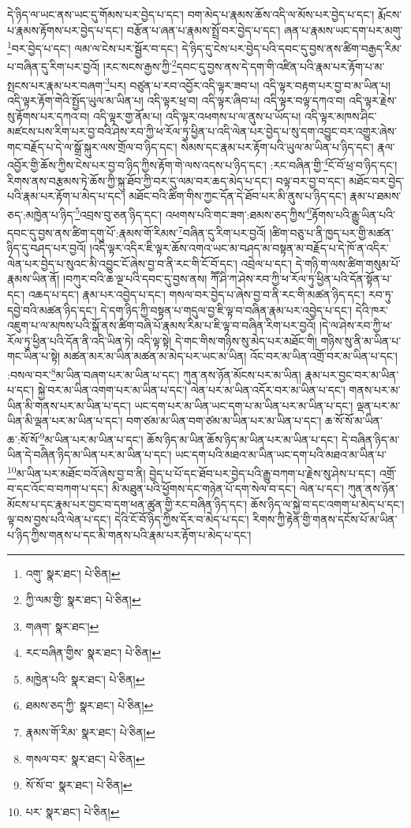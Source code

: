 དེ་ཉིད་ལ་ཡང་ནས་ཡང་དུ་གོམས་པར་བྱེད་པ་དང་། བག་མེད་པ་རྣམས་ཆོས་འདི་ལ་མོས་པར་བྱེད་པ་དང་། རྨོངས་པ་རྣམས་རྟོགས་པར་བྱེད་པ་དང་། བརྩོན་པ་ཞན་པ་རྣམས་སྤྲོ་བར་བྱེད་པ་དང་། ཞན་པ་རྣམས་ཡང་དག་པར་མགུ་\footnote{འགུ་  སྣར་ཐང་།  པེ་ཅིན། }བར་བྱེད་པ་དང་། ལམ་ལ་ངེས་པར་སྦྱོར་བ་དང་། དེ་ཉིད་དུ་ངེས་པར་བྱེད་པའི་དབང་དུ་བྱས་ནས་ཚིག་བརྒྱད་རིམ་པ་བཞིན་དུ་རིག་པར་བྱའོ། །རང་སངས་རྒྱས་ཀྱི་\footnote{ཀྱི་ལམ་གྱི་  སྣར་ཐང་།  པེ་ཅིན། }དབང་དུ་བྱས་ནས་དེ་དག་གི་འཛིན་པའི་རྣམ་པར་རྟོག་པ་མ་སྤངས་པར་རྣམ་པར་བཞག་\footnote{གཞག་  སྣར་ཐང་། }པར། བཙུན་པ་རབ་འབྱོར་འདི་ལྟར་ཟབ་པ། འདི་ལྟར་བརྟག་པར་བྱ་བ་མ་ཡིན་པ། འདི་ལྟར་རྟོག་གེའི་སྤྱོད་ཡུལ་མ་ཡིན་པ། འདི་ལྟར་ཕྲ་བ། འདི་ལྟར་ཞིབ་པ། འདི་ལྟར་བལྟ་དཀའ་བ། འདི་ལྟར་རྗེས་སུ་རྟོགས་པར་དཀའ་བ། འདི་ལྟར་གྱ་ནོམ་པ། འདི་ལྟར་འཕགས་པ་ལ་ནུས་པ་ཡོད་པ། འདི་ལྟར་མཁས་ཤིང་མཛངས་པས་རིག་པར་བྱ་བའི་ཤེས་རབ་ཀྱི་ཕ་རོལ་ཏུ་ཕྱིན་པ་འདི་ལེན་པར་བྱེད་པ་སུ་དག་འབྱུང་བར་འགྱུར་ཞེས་གང་བརྗོད་པ་དེ་ལ་སྒྲོ་སྐུར་ལས་གྲོལ་བ་ཉིད་དང་། སེམས་དང་རྣམ་པར་རྟོག་པའི་ཡུལ་མ་ཡིན་པ་ཉིད་དང་། རྣལ་འབྱོར་གྱི་ཆོས་ཀྱིས་ངེས་པར་བྱ་བ་ཉིད་ཀྱིས་རྟོག་གེ་ལས་འདས་པ་ཉིད་དང་། :རང་བཞིན་གྱི་\footnote{རང་བཞིན་གྱིས་  སྣར་ཐང་།  པེ་ཅིན། }ངོ་བོ་ཕྲ་བ་ཉིད་དང་། རིགས་ནས་བརྩམས་ཏེ་ཆོས་ཀྱི་སྐུ་ཐོབ་ཀྱི་བར་དུ་ལམ་བར་ཆད་མེད་པ་དང་། བལྟ་བར་བྱ་བ་དང་། མཐོང་བར་བྱེད་པའི་རྣམ་པར་རྟོག་པ་མེད་པ་དང་། མཐོང་བའི་ཚིག་གིས་ཀྱང་དོན་དེ་ཐོབ་པར་མི་ནུས་པ་ཉིད་དང་། རྣམ་པ་ཐམས་ཅད་:མཁྱེན་པ་ཉིད་\footnote{མཁྱེན་པའི་  སྣར་ཐང་།  པེ་ཅིན། }འབྲས་བུ་ཅན་ཉིད་དང་། འཕགས་པའི་གང་ཟག་:ཐམས་ཅད་ཀྱིས་\footnote{ཐམས་ཅད་ཀྱི་  སྣར་ཐང་།  པེ་ཅིན། }རྟོགས་པའི་རྒྱུ་ཡིན་པའི་དབང་དུ་བྱས་ནས་ཚིག་དགུ་པོ་:རྣམས་གོ་རིམས་\footnote{རྣམས་གོ་རིམ་  སྣར་ཐང་།  པེ་ཅིན། }བཞིན་དུ་རིག་པར་བྱའོ། །ཚིག་བཅུ་པ་ནི་ཁྱད་པར་གྱི་མཚན་ཉིད་དུ་བཤད་པར་བྱའོ། །འདི་ལྟར་འདིར་ཇི་ལྟར་ཆོས་འགའ་ཡང་མ་བཤད་མ་བསྟན་མ་བརྗོད་པ་དེ་ཁོ་ན་འདིར་ལེན་པར་བྱེད་པ་སུའང་མི་འབྱུང་ངོ་ཞེས་བྱ་བ་ནི་རང་གི་ངོ་བོ་དང་། འབྲེལ་པ་དང་། དེ་གཉི་ག་ལས་ཚིག་གསུམ་པོ་རྣམས་ཡིན་ནོ། །བཀུར་བའི་ཆ་ལྔ་པའི་དབང་དུ་བྱས་ནས། ཀཽ་ཤི་ཀ་ཤེས་རབ་ཀྱི་ཕ་རོལ་ཏུ་ཕྱིན་པའི་དོན་སྟོན་པ་དང་། འཆད་པ་དང་། རྣམ་པར་འབྱེད་པ་དང་། གསལ་བར་བྱེད་པ་ཞེས་བྱ་བ་ནི་རང་གི་མཚན་ཉིད་དང་། རབ་ཏུ་དབྱེ་བའི་མཚན་ཉིད་དང་། དེ་དག་ཉིད་ཀྱི་བསྟན་པ་གདུལ་བྱ་ཇི་ལྟ་བ་བཞིན་རྣམ་པར་འབྱེད་པ་དང་། དེའི་ཁར་འཇུག་པ་ལ་མཁས་པའི་སྒོ་ནས་ཚིག་བཞི་པོ་རྣམས་རིམ་པ་ཇི་ལྟ་བ་བཞིན་རིག་པར་བྱའོ། །དེ་ལ་ཤེས་རབ་ཀྱི་ཕ་རོལ་ཏུ་ཕྱིན་པའི་དོན་ནི་འདི་ཡིན་ཏེ། འདི་ལྟ་སྟེ། དེ་གང་གིས་གཉིས་སུ་མེད་པར་མཐོང་གི། གཉིས་སུ་ནི་མ་ཡིན་པ་གང་ཡིན་པ་སྟེ། མཚན་མར་མ་ཡིན་མཚན་མ་མེད་པར་ཡང་མ་ཡིན། འོང་བར་མ་ཡིན་འགྲོ་བར་མ་ཡིན་པ་དང་། :བསལ་བར་\footnote{གསལ་བར་  སྣར་ཐང་།  པེ་ཅིན། }མ་ཡིན་བཞག་པར་མ་ཡིན་པ་དང་། ཀུན་ནས་ཉོན་མོངས་པར་མ་ཡིན། རྣམ་པར་བྱང་བར་མ་ཡིན་པ་དང་། སྐྱེ་བར་མ་ཡིན་འགག་པར་མ་ཡིན་པ་དང་། ལེན་པར་མ་ཡིན་འདོར་བར་མ་ཡིན་པ་དང་། གནས་པར་མ་ཡིན་མི་གནས་པར་མ་ཡིན་པ་དང་། ཡང་དག་པར་མ་ཡིན་ཡང་དག་པ་མ་ཡིན་པར་མ་ཡིན་པ་དང་། ལྡན་པར་མ་ཡིན་མི་ལྡན་པར་མ་ཡིན་པ་དང་། བག་ཙམ་མ་ཡིན་བག་ཙམ་མ་ཡིན་པར་མ་ཡིན་པ་དང་། ཆ་སོ་སོ་མ་ཡིན་ཆ་:སོ་སོ་\footnote{སོ་སོ་བ་  སྣར་ཐང་།  པེ་ཅིན། }མ་ཡིན་པར་མ་ཡིན་པ་དང་། ཆོས་ཉིད་མ་ཡིན་ཆོས་ཉིད་མ་ཡིན་པར་མ་ཡིན་པ་དང་། དེ་བཞིན་ཉིད་མ་ཡིན་དེ་བཞིན་ཉིད་མ་ཡིན་པར་མ་ཡིན་པ་དང་། ཡང་དག་པའི་མཐའ་མ་ཡིན་ཡང་དག་པའི་མཐའ་མ་ཡིན་པ་\footnote{པར་  སྣར་ཐང་།  པེ་ཅིན། }མ་ཡིན་པར་མཐོང་བའོ་ཞེས་བྱ་བ་ནི། བྱེད་པ་པོ་དང་ཐོབ་པར་བྱེད་པའི་རྒྱུ་བཀག་པ་རྗེས་སུ་ཤེས་པ་དང་། འགྲོ་བ་དང་འོང་བ་བཀག་པ་དང་། མི་མཐུན་པའི་ཕྱོགས་དང་གཉེན་པོ་དག་སེལ་བ་དང་། ལེན་པ་དང་། ཀུན་ནས་ཉོན་མོངས་པ་དང་རྣམ་པར་བྱང་བ་དག་ཕན་ཚུན་གྱི་རང་བཞིན་ཉིད་དང་། ཆོས་ཉིད་ལ་སྐྱེ་བ་དང་འགག་པ་མེད་པ་དང་། ལྟ་བས་བྱས་པའི་ལེན་པ་དང་། དེའི་ངོ་བོ་ཉིད་ཀྱིས་དོར་བ་མེད་པ་དང་། རིགས་ཀྱི་རྟེན་གྱི་གནས་དངོས་པོ་མ་ཡིན་པ་ཉིད་ཀྱིས་གནས་པ་དང་མི་གནས་པའི་རྣམ་པར་རྟོག་པ་མེད་པ་དང་། 